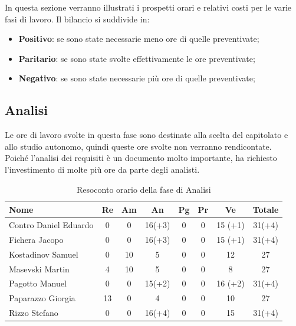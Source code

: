 \documentclass[../piano_di_progetto.tex]{subfiles}
\begin{document}
In questa sezione verranno illustrati i prospetti orari e relativi costi per le varie fasi di lavoro. Il bilancio si suddivide in:
\begin{itemize}
\item \textbf{Positivo}: se sono state necessarie meno ore di quelle preventivate;
\item \textbf{Paritario}: se sono state svolte effettivamente le ore preventivate;
\item \textbf{Negativo}: se sono state necessarie più ore di quelle preventivate;
\end{itemize}

\subsection{Analisi}%
\label{sub:cons_analisi}
Le ore di lavoro svolte in questa fase sono destinate alla scelta del capitolato e allo studio autonomo, quindi queste ore svolte non verranno rendicontate.\\
Poiché l'analisi dei requisiti è un documento molto importante, ha richiesto l'investimento di molte più ore da parte degli analisti.

\begin{table}[!ht]
	\centering
	\begin{tabular}{|l|c|c|c|c|c|c|c|}
	\hline
	\rowcolor{lightgray}
	\textbf{Nome} & \textbf{Re} & \textbf{Am} & \textbf{An} & \textbf{Pg}  & \textbf{Pr}   & \textbf{Ve} & \textbf{Totale}\\
	\hline
	Contro Daniel Eduardo & 0 & 0 & 16(+3) & 0 & 0 & 15 (+1) & 31(+4) \\
	Fichera Jacopo & 0 & 0 & 16(+3) & 0 & 0 & 15 (+1) & 31(+4) \\
	Kostadinov Samuel & 0 & 10 & 5 & 0 & 0 & 12 & 27 \\			
	Masevski Martin & 4 & 10 & 5 & 0 & 0 & 8 & 27 \\
	Pagotto Manuel & 0 & 0 & 15(+2) & 0 & 0 & 16 (+2) & 31(+4) \\			
	Paparazzo Giorgia & 13 & 0 & 4 & 0 & 0 & 10 & 27 \\
	Rizzo Stefano & 0 & 0 & 16(+4) & 0 & 0 & 15 & 31(+4) \\
	\hline
	\end{tabular}
	\caption{Resoconto orario della fase di Analisi}
\end{table}
\end{document}
